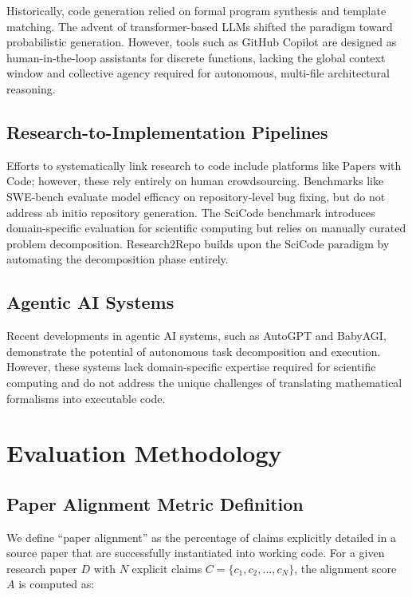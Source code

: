 \documentclass[10pt]{article}
\begin{document}
Historically, code generation relied on formal program synthesis and template matching. The advent of transformer-based LLMs shifted the paradigm toward probabilistic generation. However, tools such as GitHub Copilot are designed as human-in-the-loop assistants for discrete functions, lacking the global context window and collective agency required for autonomous, multi-file architectural reasoning.

\subsection{Research-to-Implementation Pipelines}

Efforts to systematically link research to code include platforms like Papers with Code; however, these rely entirely on human crowdsourcing. Benchmarks like SWE-bench evaluate model efficacy on repository-level bug fixing, but do not address ab initio repository generation. The SciCode benchmark introduces domain-specific evaluation for scientific computing but relies on manually curated problem decomposition. Research2Repo builds upon the SciCode paradigm by automating the decomposition phase entirely.

\subsection{Agentic AI Systems}

Recent developments in agentic AI systems, such as AutoGPT and BabyAGI, demonstrate the potential of autonomous task decomposition and execution. However, these systems lack domain-specific expertise required for scientific computing and do not address the unique challenges of translating mathematical formalisms into executable code.

\section{Evaluation Methodology}

\subsection{Paper Alignment Metric Definition}

We define ``paper alignment'' as the percentage of claims explicitly detailed in a source paper that are successfully instantiated into working code. For a given research paper $D$ with $N$ explicit claims $C = \{c_1, c_2, \dots, c_N\}$, the alignment score $A$ is computed as:
\end{document}
